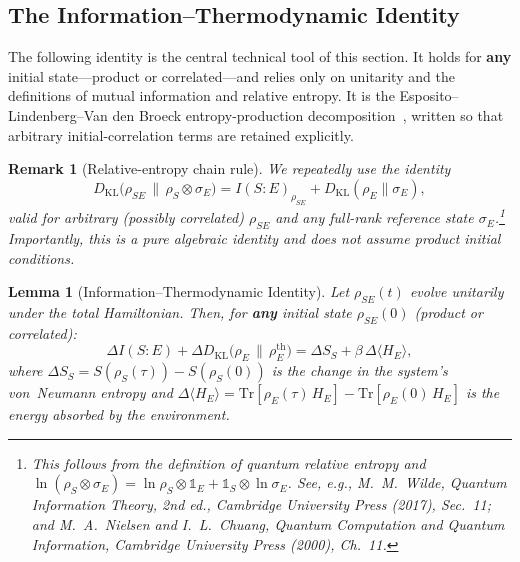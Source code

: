 \documentclass[12pt]{article}
\newtheorem{lemma}[theorem]{Lemma}
\newtheorem{remark}[theorem]{Remark}
\begin{document}
\subsection{The Information--Thermodynamic Identity}

The following identity is the central technical tool of this
section.
It holds for \textbf{any} initial state---product or
correlated---and relies only on unitarity and the definitions
of mutual information and relative entropy.
It is the Esposito--Lindenberg--Van den Broeck entropy-production
decomposition~\cite{EspositoLindenbergVandenBroeck2010}, written so
that arbitrary initial-correlation terms are retained explicitly.

\begin{remark}[Relative-entropy chain rule]
\label{rem:chain_rule}
We repeatedly use the identity
\begin{equation}
\label{eq:chain_general}
D_{\mathrm{KL}}\!\bigl(\rho_{SE}\,\big\|\,
  \rho_S\otimes\sigma_E\bigr)
= I(S{:}E)_{\rho_{SE}}
  + D_{\mathrm{KL}}(\rho_E\|\sigma_E),
\end{equation}
valid for \emph{arbitrary} (possibly correlated)
$\rho_{SE}$ and any full-rank reference state
$\sigma_E$.\footnote{This follows from the definition of
quantum relative entropy and
$\ln(\rho_S\otimes\sigma_E)
= \ln\rho_S\otimes\mathbb{1}_E
  +\mathbb{1}_S\otimes\ln\sigma_E$.
See, e.g., M.~M.~Wilde, \emph{Quantum Information
Theory}, 2nd ed., Cambridge University Press (2017),
Sec.~11; and M.~A.~Nielsen and I.~L.~Chuang,
\emph{Quantum Computation and Quantum Information},
Cambridge University Press (2000), Ch.~11.}
Importantly, this is a \emph{pure algebraic identity} and
does not assume product initial conditions.
\end{remark}

\begin{lemma}[Information--Thermodynamic Identity]
\label{lem:info_thermo}
Let $\rho_{SE}(t)$ evolve unitarily under the total
Hamiltonian.
Then, for \textbf{any} initial state $\rho_{SE}(0)$
(product or correlated):
\begin{equation}
\label{eq:info_thermo}
\Delta I(S{:}E)
+ \Delta D_{\mathrm{KL}}\!\bigl(\rho_E \,\big\|\,
  \rho_E^{\mathrm{th}}\bigr)
= \Delta S_S + \beta\,\Delta\langle H_E \rangle,
\end{equation}
where $\Delta S_S = S(\rho_S(\tau)) - S(\rho_S(0))$ is the
change in the system's von~Neumann entropy and
$\Delta\langle H_E \rangle
= \mathrm{Tr}[\rho_E(\tau)\, H_E]
  - \mathrm{Tr}[\rho_E(0)\, H_E]$
is the energy absorbed by the environment.
\end{lemma}
\end{document}
